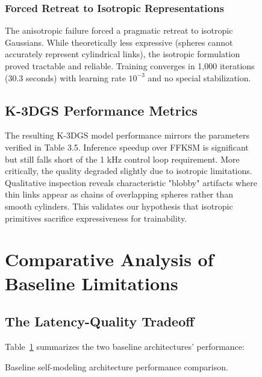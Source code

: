 \documentclass[12pt,a4paper,oneside]{report}
\begin{document}
\begin{figure}[H]
\subsubsection{Forced Retreat to Isotropic Representations}

The anisotropic failure forced a pragmatic retreat to isotropic Gaussians. While theoretically less expressive (spheres cannot accurately represent cylindrical links), the isotropic formulation proved tractable and reliable. Training converges in 1,000 iterations (30.3 seconds) with learning rate $10^{-3}$ and no special stabilization.

\subsection{K-3DGS Performance Metrics}

The resulting K-3DGS model performance mirrors the parameters verified in Table 3.5. Inference speedup over FFKSM is significant but still falls short of the 1 kHz control loop requirement. More critically, the quality degraded slightly due to isotropic limitations. Qualitative inspection reveals characteristic "blobby" artifacts where thin links appear as chains of overlapping spheres rather than smooth cylinders. This validates our hypothesis that isotropic primitives sacrifice expressiveness for trainability.

\section{Comparative Analysis of Baseline Limitations}
\subsection{The Latency-Quality Tradeoff}

Table~\ref{tab:baseline_comparison_ch3} summarizes the two baseline architectures' performance:
\begin{table}[H]
\centering
\caption{Baseline self-modeling architecture performance comparison.}
\label{tab:baseline_comparison_ch3}
\end{table}


\end{figure}
\end{document}

